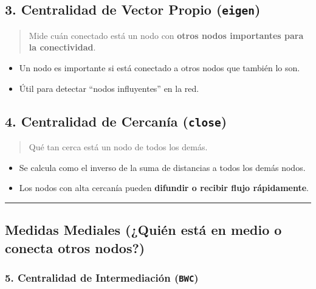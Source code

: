 \documentclass[
]{book}
\providecommand{\tightlist}{%
  \setlength{\itemsep}{0pt}\setlength{\parskip}{0pt}}
\begin{document}
\subsection{\texorpdfstring{3. Centralidad de Vector Propio (\texttt{eigen})}{3. Centralidad de Vector Propio (eigen)}}\label{centralidad-de-vector-propio-eigen}

\begin{quote}
Mide cuán conectado está un nodo con \textbf{otros nodos importantes para la conectividad}.
\end{quote}

\begin{itemize}
\tightlist
\item
  Un nodo es importante si está conectado a otros nodos que también lo son.
\item
  Útil para detectar ``nodos influyentes'' en la red.
\end{itemize}

\subsection{\texorpdfstring{4. Centralidad de Cercanía (\texttt{close})}{4. Centralidad de Cercanía (close)}}\label{centralidad-de-cercanuxeda-close}

\begin{quote}
Qué tan cerca está un nodo de todos los demás.
\end{quote}

\begin{itemize}
\tightlist
\item
  Se calcula como el inverso de la suma de distancias a todos los demás nodos.
\item
  Los nodos con alta cercanía pueden \textbf{difundir o recibir flujo rápidamente}.
\end{itemize}

\begin{center}\rule{0.5\linewidth}{0.5pt}\end{center}

\subsection{Medidas Mediales (¿Quién está en medio o conecta otros nodos?)}\label{medidas-mediales-quiuxe9n-estuxe1-en-medio-o-conecta-otros-nodos}

\subsubsection{\texorpdfstring{5. Centralidad de Intermediación (\texttt{BWC})}{5. Centralidad de Intermediación (BWC)}}\label{centralidad-de-intermediaciuxf3n-bwc}
\end{document}
